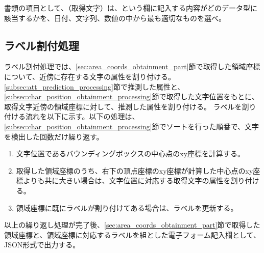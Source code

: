 書類の項目として、（取得文字）は、という欄に記入する内容がどのデータ型に該当するかを、日付、文字列、数値の中から最も適切なものを選べ。

\subsection{ラベル割付処理}\label{subsec:label_link_processing}
ラベル割付処理では、\ref{sec:area_coords_obtainment_part}節で取得した領域座標について、近傍に存在する文字の属性を割り付ける。
\ref{subsec:att_prediction_processing}節で推測した属性と、\ref{subsec:char_position_obtainment_processing}節で取得した文字位置をもとに、取得文字近傍の領域座標に対して、推測した属性を割り付ける。
ラベルを割り付ける流れを以下に示す。以下の処理は、\ref{subsec:char_position_obtainment_processing}節でソートを行った順番で、文字を検出した回数だけ繰り返す。

\begin{enumerate}
    \item 文字位置であるバウンディングボックスの中心点のxy座標を計算する。
    \item 取得した領域座標のうち、右下の頂点座標のxy座標が計算した中心点のxy座標よりも共に大きい場合は、文字位置に対応する取得文字の属性を割り付ける。
    \item 領域座標に既にラベルが割り付けてある場合は、ラベルを更新する。
\end{enumerate}

以上の繰り返し処理が完了後、\ref{sec:area_coords_obtainment_part}節で取得した領域座標と、領域座標に対応するラベルを組とした電子フォーム記入欄として、JSON形式で出力する。
